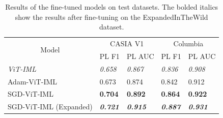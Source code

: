 \begin{table}[]
\centering
\small
\begin{tabular}{|l|ll|ll|}
\hline
\multicolumn{1}{|c|}{\multirow{2}{*}{Model}} & \multicolumn{2}{c|}{CASIA V1} & \multicolumn{2}{c|}{Columbia} \\ \cline{2-5} 
\multicolumn{1}{|c|}{} & \multicolumn{1}{c|}{PL F1} & \multicolumn{1}{c|}{PL AUC} & \multicolumn{1}{c|}{PL F1} & \multicolumn{1}{c|}{PL AUC} \\ \hline
\textit{ViT-IML} & \multicolumn{1}{l|}{\textit{0.658}} & \textit{0.867} & \multicolumn{1}{l|}{\textit{0.836}} & \textit{0.908} \\ \hline
Adam-ViT-IML & \multicolumn{1}{l|}{0.673} & 0.874 & \multicolumn{1}{l|}{0.842} & 0.912 \\ \hline
SGD-ViT-IML & \multicolumn{1}{l|}{\textbf{0.704}} & \textbf{0.892} & \multicolumn{1}{l|}{\textbf{0.864}} & \textbf{0.922} \\ \hline
SGD-ViT-IML (Expanded) & \multicolumn{1}{l|}{\textbf{\textit{0.721}}} & \textbf{\textit{0.915}} & \multicolumn{1}{l|}{\textbf{\textit{0.887}}} & \textbf{\textit{0.931}} \\ \hline

\end{tabular}
\caption{Results of the fine-tuned models on test datasets. The bolded italics show the results after fine-tuning on the ExpandedInTheWild dataset.}
\end{table}
\label{table:vitresults}
